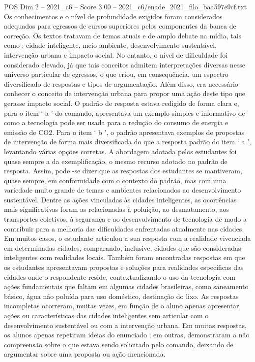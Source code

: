 \begin{textsample}{POS Dim 2 – 2021\_c6 – Score 3.00 – 2021\_c6/enade\_2021\_filo\_baa597e9cf.txt}
Os conhecimentos e o nível de profundidade exigidos foram considerados adequados para egressos de cursos superiores pelos componentes da banca de correção.
Os textos tratavam de temas atuais e de amplo debate na mídia, tais como : cidade inteligente, meio ambiente, desenvolvimento sustentável, intervenção urbana e impacto social.
No entanto, o nível de dificuldade foi considerado elevado, já que tais conceitos admitem interpretações diversas nesse universo particular de egressos, o que criou, em consequência, um espectro diversificado de respostas e tipos de argumentação.
Além disso, era necessário conhecer o conceito de intervenção urbana para propor uma ação deste tipo que gerasse impacto social.
O padrão de resposta estava redigido de forma clara e, para o item ‘ a ’ do comando, apresentava um exemplo simples e informativo de como a tecnologia pode ser usada para a redução do consumo de energia e emissão de CO2.
Para o item ‘ b ’, o padrão apresentava exemplos de propostas de intervenção de forma mais diversificada do que a resposta padrão do item ‘ a ’, levantando várias opções corretas.
A abordagem adotada pelos estudantes foi quase sempre a da exemplificação, o mesmo recurso adotado no padrão de resposta.
Assim, pode -se dizer que as respostas dos estudantes se mantiveram, quase sempre, em conformidade com o contexto do padrão, mas com uma variedade muito grande de temas e ambientes relacionados ao desenvolvimento sustentável.
Dentre as ações vinculadas às cidades inteligentes, as ocorrências mais significativas foram as relacionadas à poluição, ao desmatamento, aos transportes coletivos, à segurança e ao desenvolvimento de tecnologia de modo a contribuir para a melhoria das dificuldades enfrentadas atualmente nas cidades.
Em muitos casos, o estudante articulou a sua resposta com a realidade vivenciada em determinadas cidades, comparando, inclusive, cidades que são consideradas inteligentes com realidades locais.
Também foram encontradas respostas em que os estudantes apresentavam propostas e soluções para realidades específicas das cidades onde o respondente reside, contextualizando o uso da tecnologia com ações fundamentais que faltam em algumas cidades brasileiras, como saneamento básico, água não poluída para uso doméstico, destinação do lixo.
As respostas incompletas ocorreram, muitas vezes, em função de o aluno apenas apresentar ações ou características das cidades inteligentes sem articular com o desenvolvimento sustentável ou com a intervenção urbana.
Em muitas respostas, os alunos apenas repetiram ideias do enunciado ; em outras, demonstraram a não compreensão sobre o que estava sendo solicitado pelo comando, deixando de argumentar sobre uma proposta ou ação mencionada.

\end{textsample}
